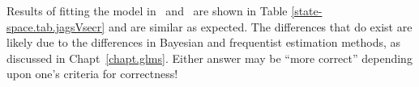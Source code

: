 Results of fitting the model in \jags~and \secr~are shown in Table
\ref{state-space.tab.jagsVsecr} and are
similar as expected. The differences that do exist are likely due to
the differences in Bayesian and frequentist estimation methods, as
discussed in Chapt~\ref{chapt.glms}. Either answer may be ``more
correct'' depending upon one's criteria for correctness!

